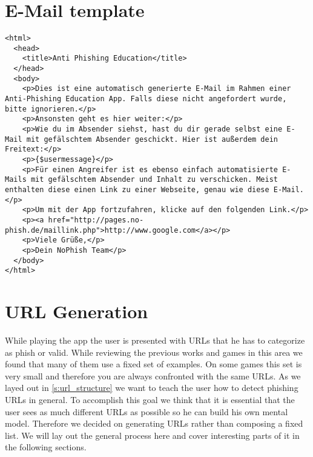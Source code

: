 \section{E-Mail template}
\label{a:mail}
\lstset{language=html}
\begin{lstlisting}
<html>
  <head>
    <title>Anti Phishing Education</title>
  </head>
  <body>
    <p>Dies ist eine automatisch generierte E-Mail im Rahmen einer Anti-Phishing Education App. Falls diese nicht angefordert wurde, bitte ignorieren.</p>
    <p>Ansonsten geht es hier weiter:</p>
    <p>Wie du im Absender siehst, hast du dir gerade selbst eine E-Mail mit gefälschtem Absender geschickt. Hier ist außerdem dein Freitext:</p>
    <p>{$usermessage}</p>
    <p>Für einen Angreifer ist es ebenso einfach automatisierte E-Mails mit gefälschtem Absender und Inhalt zu verschicken. Meist enthalten diese einen Link zu einer Webseite, genau wie diese E-Mail.</p>
    <p>Um mit der App fortzufahren, klicke auf den folgenden Link.</p>
    <p><a href="http://pages.no-phish.de/maillink.php">http://www.google.com</a></p>
    <p>Viele Grüße,</p>
    <p>Dein NoPhish Team</p>
  </body>
</html>
\end{lstlisting}

\section{URL Generation}
\label{s:url_generation}
While playing the app the user is presented with URLs that he has to categorize as phish or valid.
While reviewing the previous works and games in this area we found that many of them use a fixed set of examples.
On some games this set is very small and therefore you are always confronted with the same URLs.
As we layed out in \autoref{s:url_structure} we want to teach the user how to detect phishing URLs in general.
To accomplish this goal we think that it is essential that the user sees as much different URLs as possible so he can build his own mental model.
Therefore we decided on generating URLs rather than composing a fixed list.
We will lay out the general process here and cover interesting parts of it in the following sections.
